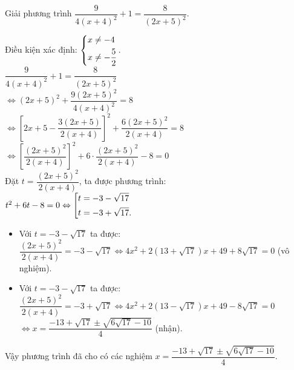 \begin{bt}%
	Giải phương trình $\dfrac{9}{4(x+4)^2} + 1 = \dfrac{8}{(2x+5)^2}$.
	\loigiai
	{
		Điều kiện xác định: $\left\{\begin{aligned}& x \neq -4 \\& x \neq -\dfrac{5}{2}\end{aligned}\right.$.\\
		\hspace*{0.6cm} $\dfrac{9}{4(x+4)^2} + 1 = \dfrac{8}{(2x+5)^2}$\\
		$\Leftrightarrow (2x+5)^2 + \dfrac{9(2x+5)^2}{4(x+4)^2} = 8$\\
		$\Leftrightarrow \left[ 2x+5 - \dfrac{3(2x+5)}{2(x+4)} \right]^2 + \dfrac{6(2x+5)^2}{2(x+4)} = 8$\\
		$\Leftrightarrow \left[\dfrac{(2x+5)^2}{2(x+4)}\right]^2 + 6 \cdot \dfrac{(2x+5)^2}{2(x+4)} - 8 = 0$\\
		Đặt $t = \dfrac{(2x+5)^2}{2(x+4)}$, ta được phương trình:\\
		\hspace*{0.6cm} $t^2 + 6t - 8 = 0 \Leftrightarrow \left[\begin{aligned}& t = -3 - \sqrt{17} \\& t = -3 + \sqrt{17}.\end{aligned}\right.$
		\begin{itemize}
			\item Với $t = -3 - \sqrt{17}$ ta được:\\
			$\dfrac{(2x+5)^2}{2(x+4)} = -3 - \sqrt{17} \Leftrightarrow 4x^2 + 2\left(13 + \sqrt{17}\right)x + 49 + 8 \sqrt{17} = 0$ (vô nghiệm).
			\item Với $t = -3 - \sqrt{17}$ ta được:\\
			$\dfrac{(2x+5)^2}{2(x+4)} = -3 + \sqrt{17} \Leftrightarrow 4x^2 + 2\left(13 - \sqrt{17}\right)x + 49 - 8 \sqrt{17} = 0$\\
			$\Leftrightarrow x = \dfrac{-13+\sqrt{17} \pm \sqrt{6\sqrt{17} - 10}}{4}$ (nhận).
		\end{itemize}
		Vậy phương trình đã cho có các nghiệm $x = \dfrac{-13+\sqrt{17} \pm \sqrt{6\sqrt{17} - 10}}{4}$.
	}
\end{bt}


